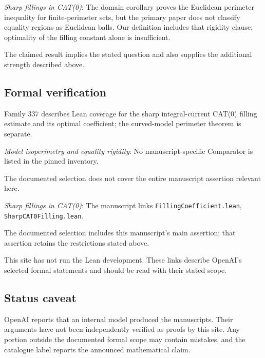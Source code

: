 \documentclass[11pt]{article}
\begin{document}
\textit{Sharp fillings in CAT(0)}: The domain corollary proves the Euclidean perimeter inequality for finite-perimeter sets, but the primary paper does not classify equality regions as Euclidean balls. Our definition includes that rigidity clause; optimality of the filling constant alone is insufficient.

The claimed result implies the stated question and also supplies the additional strength described above.

\subsection{Formal verification}
Family 337 describes Lean coverage for the sharp integral-current CAT(0) filling estimate and its optimal coefficient; the curved-model perimeter theorem is separate.

\textit{Model isoperimetry and equality rigidity}: No manuscript-specific Comparator is listed in the pinned inventory.

The documented selection does not cover the entire manuscript assertion relevant here.

\textit{Sharp fillings in CAT(0)}: The manuscript links \texttt{FillingCoefficient.lean}, \texttt{SharpCAT0Filling.lean}.

The documented selection includes this manuscript’s main assertion; that assertion retains the restrictions stated above.

This site has not run the Lean development. These links describe OpenAI’s selected formal statements and should be read with their stated scope.

\subsection{Status caveat}
OpenAI reports that an internal model produced the manuscripts. Their arguments have not been independently verified as proofs by this site. Any portion outside the documented formal scope may contain mistakes, and the catalogue label reports the announced mathematical claim.
\end{document}
